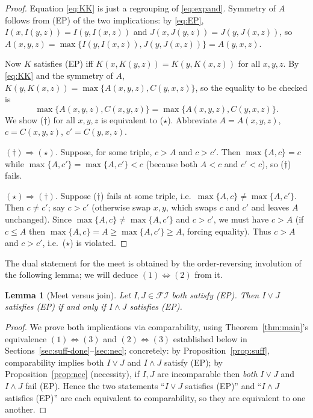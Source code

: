 \documentclass{amsart}
\theoremstyle{plain}
\newtheorem{lemma}{Lemma}
\theoremstyle{definition}
\newcommand{\FI}{\mathcal{FI}}
\begin{document}
\begin{proof}
Equation \eqref{eq:KK} is just a regrouping of \eqref{eq:expand}.
Symmetry of $A$ follows from (EP) of the two implications: by \eqref{eq:EP},
$I(x,I(y,z))=I(y,I(x,z))$ and $J(x,J(y,z))=J(y,J(x,z))$, so
$A(x,y,z)=\max\{I(y,I(x,z)),J(y,J(x,z))\}=A(y,x,z)$.

Now $K$ satisfies (EP) iff $K(x,K(y,z))=K(y,K(x,z))$ for all $x,y,z$. By
\eqref{eq:KK} and the symmetry of $A$, $K(y,K(x,z))=\max\{A(x,y,z),C(y,x,z)\}$, so
the equality to be checked is
\[
\max\{A(x,y,z),C(x,y,z)\}=\max\{A(x,y,z),C(y,x,z)\}.
\tag{$\dagger$}
\]
We show ($\dagger$) for all $x,y,z$ is equivalent to ($\star$). Abbreviate
$A=A(x,y,z)$, $c=C(x,y,z)$, $c'=C(y,x,z)$.

$(\dagger)\Rightarrow(\star)$. Suppose, for some triple, $c>A$ and $c>c'$. Then
$\max\{A,c\}=c$ while $\max\{A,c'\}=\max\{A,c'\}<c$ (because both $A<c$ and $c'<c$), so
($\dagger$) fails.

$(\star)\Rightarrow(\dagger)$. Suppose ($\dagger$) fails at some triple, i.e.\
$\max\{A,c\}\ne\max\{A,c'\}$. Then $c\ne c'$; say $c>c'$ (otherwise swap $x,y$, which swaps
$c$ and $c'$ and leaves $A$ unchanged). Since $\max\{A,c\}\ne\max\{A,c'\}$ and $c>c'$, we
must have $c>A$ (if $c\le A$ then $\max\{A,c\}=A\ge\max\{A,c'\}\ge A$, forcing equality).
Thus $c>A$ and $c>c'$, i.e.\ ($\star$) is violated.
\end{proof}

The dual statement for the meet is obtained by the order-reversing involution of the
following lemma; we will deduce $(1)\Leftrightarrow(2)$ from it.

\begin{lemma}[Meet versus join]\label{lem:meet}
Let $I,J\in\FI$ both satisfy \textup{(EP)}. Then $I\vee J$ satisfies \textup{(EP)} if and
only if $I\wedge J$ satisfies \textup{(EP)}.
\end{lemma}

\begin{proof}
We prove both implications via comparability, using Theorem~\ref{thm:main}'s equivalence
$(1)\Leftrightarrow(3)$ and $(2)\Leftrightarrow(3)$ established below in
Sections~\ref{sec:suff-done}--\ref{sec:nec}; concretely: by
Proposition~\ref{prop:suff}, comparability implies both $I\vee J$ and $I\wedge J$ satisfy
(EP); by Proposition~\ref{prop:nec} (necessity), if $I,J$ are incomparable then
\emph{both} $I\vee J$ and $I\wedge J$ fail (EP). Hence the two statements ``$I\vee J$
satisfies (EP)'' and ``$I\wedge J$ satisfies (EP)'' are each equivalent to comparability,
so they are equivalent to one another.
\end{proof}
\end{document}
